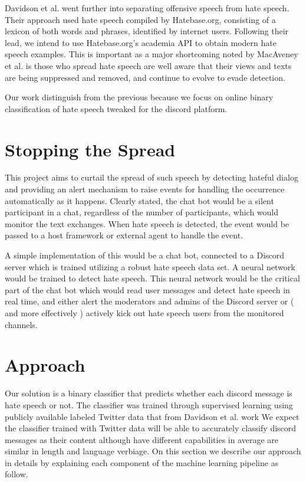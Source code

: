 \documentclass[conference]{sig-alternate-05-2015}
\begin{document}
Davidson et al. went further into separating offensive speech from hate speech.  Their approach used hate speech compiled by Hatebase.org, consisting of a lexicon of both words and phrases, identified by internet users.  Following their lead, we intend to use Hatebase.org's academia API to obtain modern hate speech examples.  This is important as a major shortcoming noted by MacAveney et al.\cite{MacAvaneyetal.} is those who spread hate speech are well aware that their views and texts are being suppressed and removed, and continue to evolve to evade detection.

Our work distinguish from the previous because we focus on online binary classification of hate speech tweaked for the discord platform.  

\section{Stopping the Spread}\label{sec:design}
This project aims to curtail the spread of such speech by detecting hateful dialog and providing an alert mechanism to raise events for handling the occurrence automatically as it happens.  Clearly stated, the chat bot would be a silent participant in a chat, regardless of the number of participants, which would monitor the text exchanges.  When hate speech is detected, the event would be passed to a host framework or external agent to handle the event.

A simple implementation of this would be a chat bot, connected to a Discord server which is trained utilizing a robust hate speech data set. A neural network would be trained to detect hate speech. This neural network would be the critical part of the chat bot which would read user messages and detect hate speech in real time, and either alert the moderators and admins of the Discord server or ( and more effectively ) actively kick out hate speech users from the monitored channels.

\section{Approach}\label{sec:approach}
Our solution is a binary classifier that predicts whether each discord message is hate speech or not. The classifier was trained through supervised learning using publicly available labeled Twitter data that from Davidson et al. work \cite{Davidsonetal.}
We expect the classifier trained with Twitter data will be able to accurately classify discord messages as their content although have different capabilities in average are similar in length and language verbiage. 
On this section we describe our approach in details by explaining each component of the machine learning pipeline as follow.
 
\end{document}

